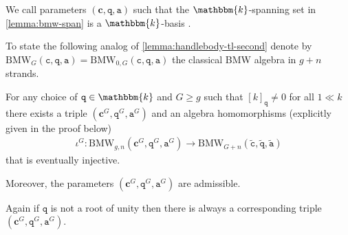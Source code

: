 \documentclass[a4paper,11pt]{amsart}
\let\emph\relax
\newcommand{\setstuff}[1]{\mathrm{#1}}
\newcommand{\KK}{\mathbbm{k}}
\newcommand{\bsym}[1]{\boldsymbol{#1}}
\newcommand{\varsym}[1]{\mathtt{#1}}
\newcommand{\qvar}{\varsym{q}}
\newcommand{\cpar}{\bsym{c}}
\newcommand{\cvar}{\varsym{c}}
\newcommand{\avar}{\varsym{a}}
\numberwithin{equation}{section}
\let\fullref\autoref
\begin{document}
\begin{definition}
We call parameters $(\cpar,\qvar,\avar)$ such that the $\KK$-spanning set 
in \fullref{lemma:bmw-span} is a $\KK$-basis
\emph{admissible}.
\end{definition}

To state the following analog of \fullref{lemma:handlebody-tl-second} denote by $\setstuff{BMW}_{G}(\cvar,\qvar,\avar)
=\setstuff{BMW}_{0,G}(\cvar,\qvar,\avar)$ 
the classical BMW algebra in $g+n$ strands. 

\begin{lemma}\label{lemma:handlebody-bmw-second}
For any choice of $\qvar\in\KK$ and $G\geq g$ such that 
$[k]_{\qvar}\neq 0$ 
for all $1\ll k$ there exists 
a triple $(\cpar^{G},\qvar^{G},\avar^{G})$ and 
an algebra homomorphisms 
(explicitly given in the proof below)
\begin{gather*}
\iota^{G}\colon\setstuff{BMW}_{g,n}(\cpar^{G},\qvar^{G},\avar^{G})
\to\setstuff{BMW}_{G+n}(\tilde{\cvar},\tilde{\qvar},\tilde{\avar})
\end{gather*}
that is eventually injective.

Moreover, the parameters $(\cpar^{G},\qvar^{G},\avar^{G})$ are admissible.
\end{lemma}

Again if $\qvar$ is not a root of unity then there is 
always a corresponding triple $(\cpar^{G},\qvar^{G},\avar^{G})$.
\end{document}
